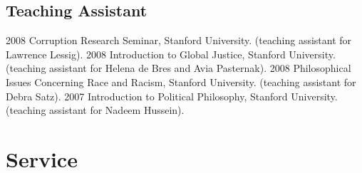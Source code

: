 \documentclass[letterpaper]{moderncv}
\begin{document}
\subsection{Teaching Assistant}
\cvitem
{2008}
{Corruption Research Seminar, Stanford University.
  \newline
  (teaching assistant for Lawrence Lessig).
}
\vspace{1mm}
\cvitem
{2008}
{Introduction to Global Justice, Stanford University.
  \newline
  (teaching assistant for Helena de Bres and Avia Pasternak).
}
\vspace{1mm}
\cvitem
{2008}
{Philosophical Issues Concerning Race and Racism, Stanford University.
  \newline
  (teaching assistant for Debra Satz).
}
\vspace{1mm}
\cvitem
{2007}
{Introduction to Political Philosophy, Stanford University.
  \newline
  (teaching assistant for Nadeem Hussein).
}
\vspace{1mm}

\section{Service}
\end{document}
